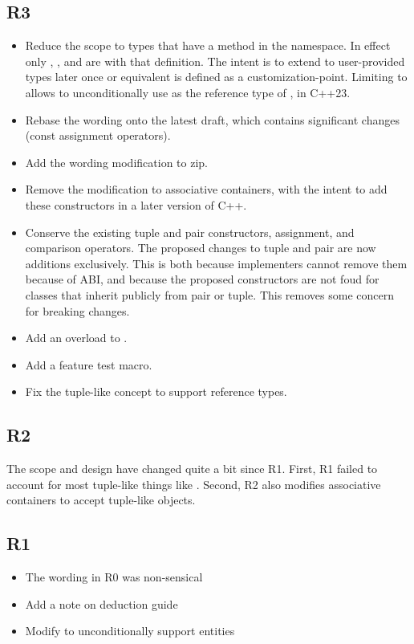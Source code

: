 \documentclass{wg21}
\begin{document}
\subsection{R3}
\begin{itemize}
\item Reduce the scope to types that have a  method in the  namespace.
In effect only , ,  and  are 
with that definition.
The intent is to extend to user-provided types later once  or equivalent is defined as a customization-point.
Limiting to  allows to unconditionally use  as the reference type of ,  in C++23.
\item Rebase the wording onto the latest draft, which contains significant changes (const assignment operators).
\item Add the wording modification to zip.
\item Remove the modification to associative containers, with the intent to add these constructors in a later version of C++.
\item Conserve the existing tuple and pair constructors, assignment, and comparison operators. The proposed changes to tuple and pair are now additions exclusively. This is both because implementers cannot remove them because of ABI, and because the proposed constructors are not foud for classes that inherit publicly from pair or tuple. This removes some concern for breaking changes.
\item Add an overload to .
\item Add a feature test macro.
\item Fix the tuple-like concept to support reference types.
\end{itemize}

\subsection{R2}

The scope and design have changed quite a bit since R1. First, R1 failed to account for most tuple-like things like .
Second, R2 also modifies associative containers to accept tuple-like objects.

\subsection{R1}
\begin{itemize}
    \item The wording in R0 was non-sensical
    \item Add a note on deduction guide
    \item Modify  to unconditionally support  entities
\end{itemize}
\end{document}
